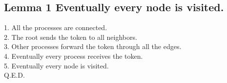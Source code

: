 \documentclass{article}
\begin{document}
\subsection{Lemma 1 Eventually every node is visited.}
1. All the processes are connected.\\
2. The root sends the token to all neighbors.\\
3. Other processes forward the token through all the edges.\\
4. Eventually every process receives the token.\\
5. Eventually every node is visited.\\
Q.E.D.
\end{document}
